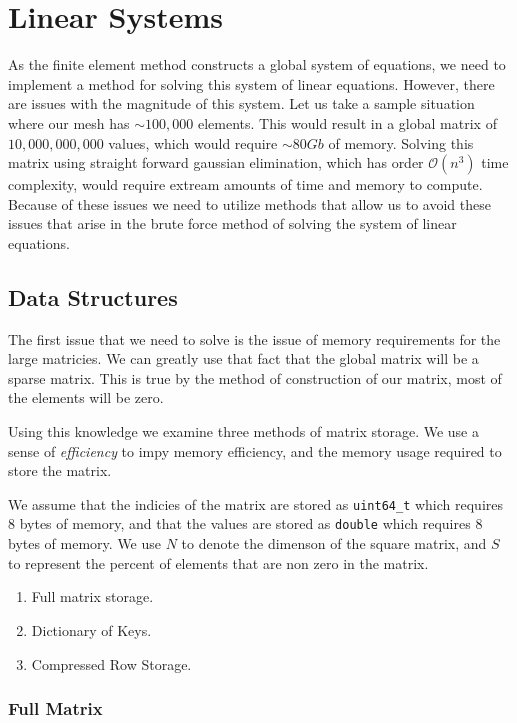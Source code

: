 \documentclass[../fem.tex]{subfiles}
\begin{document}
\section{Linear Systems}%
\label{sec:linear_systems}

As the finite element method constructs a global system of equations, we need
to implement a method for solving this system of linear equations. However,
there are issues with the magnitude of this system. Let us take a sample
situation where our mesh has $\sim 100,000$ elements. This would result in a
global matrix of $10,000,000,000$ values, which would require $\sim 80Gb$ of
memory. Solving this matrix using straight forward gaussian elimination, which
has order $\mathcal{O}(n^3)$ time complexity, would require extream amounts of
time and memory to compute. Because of these issues we need to utilize methods
that allow us to avoid these issues that arise in the brute force method of
solving the system of linear equations.

\subsection{Data Structures}%
\label{sub:data_structures}

The first issue that we need to solve is the issue of memory requirements for
the large matricies. We can greatly use that fact that the global matrix will
be a sparse matrix. This is true by the method of construction of our matrix,
most of the elements will be zero.

Using this knowledge we examine three methods of matrix storage. We use a sense
of \textit{efficiency} to impy memory efficiency, and the memory usage required
to store the matrix.

We assume that the indicies of the matrix are stored as
\texttt{uint64_t} which requires $8$ bytes of memory, and that the
values are stored as \texttt{double} which requires $8$ bytes of
memory. We use $N$ to denote the dimenson of the square matrix, and $S$ to
represent the percent of elements that are non zero in the matrix.

\begin{enumerate}[label=\arabic*.]
  \item Full matrix storage.
  \item Dictionary of Keys.
  \item Compressed Row Storage.
\end{enumerate}

\subsubsection{Full Matrix}%
\label{ssub:full_matrix}
\end{document}
